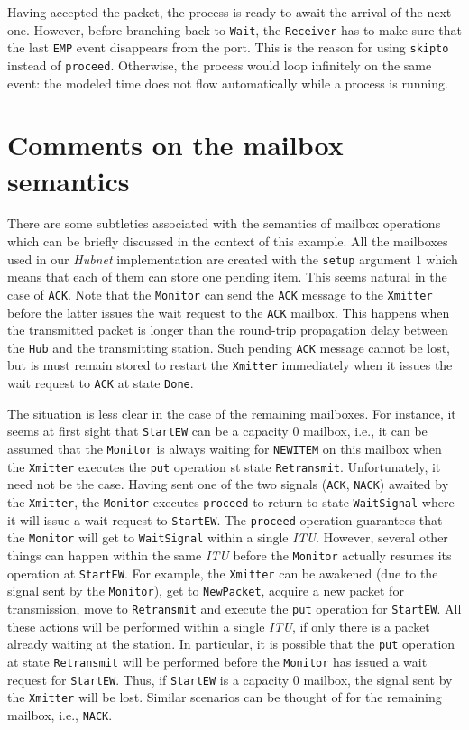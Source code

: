 Having accepted the packet, the process is ready to await the arrival of the
next one.
However, before branching back to {\tt Wait}, the {\tt Receiver}
has to make sure
that the last {\tt EMP} event disappears from the port.
This is the reason for using {\tt skipto} instead of {\tt proceed}.
Otherwise, the process would loop infinitely on the same event:
the modeled time does not flow automatically
while a process is running.

\section{Comments on the mailbox semantics}

There are some subtleties associated with the semantics of mailbox
operations which can be briefly discussed in the context of this example.
All the mailboxes used in our {\em Hubnet\/} implementation are created
with the {\tt setup} argument $1$ which means that each of them can store
one pending item.
This seems natural in the case of {\tt ACK}.
Note that the {\tt Monitor} can send the {\tt ACK} message to the {\tt Xmitter}
before the latter issues the wait request to the {\tt ACK} mailbox.
This happens when the transmitted packet is longer than the round-trip
propagation delay between the {\tt Hub} and the transmitting station.
Such pending {\tt ACK} message cannot be lost, but is must remain
stored to restart the {\tt Xmitter} immediately when it issues the wait
request to {\tt ACK} at state {\tt Done}.

The situation is less clear in the case of the remaining mailboxes.
For instance, it seems at first sight that {\tt StartEW} can be a
capacity $0$ mailbox, i.e., it can be assumed that the {\tt Monitor} is
always waiting for {\tt NEWITEM} on this mailbox when the
{\tt Xmitter} executes the {\tt put} operation st state {\tt Retransmit}.
Unfortunately, it need not be the case.
Having sent one of the two signals ({\tt ACK}, {\tt NACK}) awaited by the
{\tt Xmitter}, the {\tt Monitor} executes {\tt proceed} to return to
state {\tt WaitSignal} where it will issue a wait request to
{\tt StartEW}.
The {\tt proceed} operation guarantees that the {\tt Monitor} will get
to {\tt WaitSignal} within a single {\em ITU}.
However, several other things can happen within the same {\em ITU\/} before
the {\tt Monitor} actually resumes its operation at {\tt StartEW}.
For example, the {\tt Xmitter} can be awakened (due to the signal sent by
the {\tt Monitor}), get to {\tt NewPacket}, acquire a new
packet for transmission, move to {\tt Retransmit} and execute the {\tt put}
operation for {\tt StartEW}.
All these actions will be performed within a single {\em ITU}, if only
there is a packet already waiting at the station.
In particular, it is possible that the {\tt put} operation at state
{\tt Retransmit} will be performed before the {\tt Monitor} has issued
a wait request for {\tt StartEW}.
Thus, if {\tt StartEW} is a capacity $0$ mailbox, the signal sent by the
{\tt Xmitter} will be lost.
Similar scenarios can be thought of for the remaining mailbox, i.e.,
{\tt NACK}.

